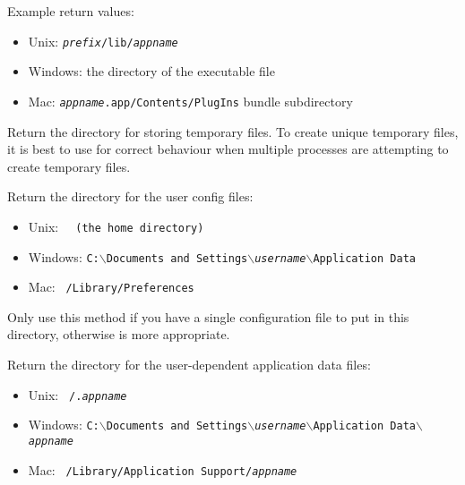 Example return values:
\begin{itemize}
    \item Unix: \texttt{\textit{prefix}/lib/\textit{appname}}
    \item Windows: the directory of the executable file
    \item Mac: \texttt{\textit{appname}.app/Contents/PlugIns} bundle subdirectory
\end{itemize}





\label{wxstandardpathsgettempdir}


Return the directory for storing temporary files. To create unique temporary files,
it is best to use  for correct behaviour when
multiple processes are attempting to create temporary files.


\label{wxstandardpathsgetuserconfigdir}


Return the directory for the user config files:
\begin{itemize}
    \item Unix: \tt{~} (the home directory)
    \item Windows: \tt{C:$\backslash$Documents and Settings$\backslash$\textit{username}$\backslash$Application Data}
    \item Mac: \tt{~/Library/Preferences}
\end{itemize}

Only use this method if you have a single configuration file to put in this
directory, otherwise  is
more appropriate.


\label{wxstandardpathsgetuserdatadir}


Return the directory for the user-dependent application data files:
\begin{itemize}
    \item Unix: \tt{~/.\textit{appname}}
    \item Windows: \tt{C:$\backslash$Documents and Settings$\backslash$\textit{username}$\backslash$Application Data$\backslash$\textit{appname}}
    \item Mac: \tt{~/Library/Application Support/\textit{appname}}
\end{itemize}


